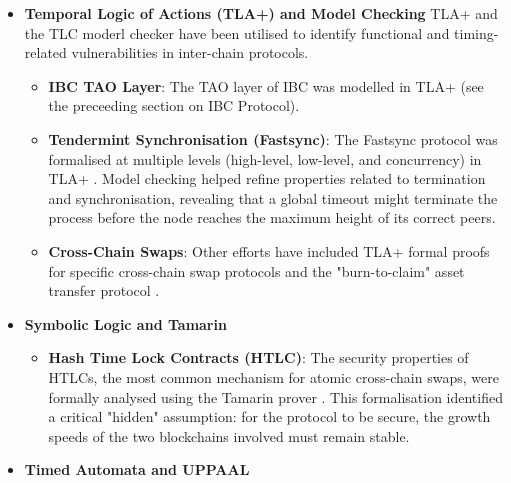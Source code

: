\begin{itemize}
\begin{itemize}
    different types of blockchains (e.g., depth-first vs. breadth-first
    execution models) \citep{kammuller2020}.
  \item
    \textbf{Gateway-Based Interoperability}: A gateway-based
    interoperability solution between Ethereum and Hyperledger Fabric
    was formalised in Event-B using the Rodin platform
    \citep{Llambas2024eventb}. It automatically discharged 23 proof
    obligations (17 invariant preservation, 6 well-definedness) using
    Rodin\textquotesingle s provers, confirming functional correctness
    and safety properties.
  \end{itemize}
\item
  \textbf{Temporal Logic of Actions (TLA+) and Model Checking} TLA+ and
  the TLC moderl checker have been utilised to identify functional and
  timing-related vulnerabilities in inter-chain protocols.

  \begin{itemize}
  \tightlist
  \item
    \textbf{IBC TAO Layer}: The TAO layer of IBC was modelled in TLA+
    \citep{Wei_2023} (see the preceeding section on IBC Protocol).
  \item
    \textbf{Tendermint Synchronisation (Fastsync)}: The Fastsync
    protocol was formalised at multiple levels (high-level, low-level,
    and concurrency) in TLA+ \citep{braithwaite2020}. Model checking
    helped refine properties related to termination and synchronisation,
    revealing that a global timeout might terminate the process before
    the node reaches the maximum height of its correct peers.
  \item
    \textbf{Cross-Chain Swaps}: Other efforts have included TLA+ formal
    proofs for specific cross-chain swap protocols and the
    "burn-to-claim" asset transfer protocol \citep{Wei_2023}.
  \end{itemize}
\item
  \textbf{Symbolic Logic and Tamarin}

  \begin{itemize}
  \tightlist
  \item
    \textbf{Hash Time Lock Contracts (HTLC)}: The security properties of
    HTLCs, the most common mechanism for atomic cross-chain swaps, were
    formally analysed using the Tamarin prover \citep{boyd2020}. This
    formalisation identified a critical "hidden" assumption: for the
    protocol to be secure, the growth speeds of the two blockchains
    involved must remain stable.
  \end{itemize}
\item
  \textbf{Timed Automata and UPPAAL}


\end{itemize}
